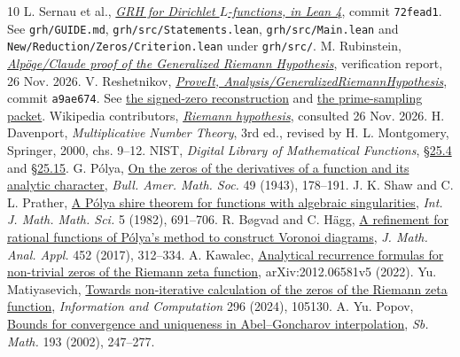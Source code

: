 \documentclass[11pt,letterpaper]{article}
\numberwithin{equation}{section}
\begin{document}
\small
\begin{thebibliography}{10}\setlength{\itemsep}{1pt}\setlength{\parsep}{0pt}\setlength{\parskip}{0pt}
 L. Sernau et al., \href{https://github.com/lsernau/grh-lean/tree/72fead102f663d5c7a407964a13dc0cf9d977207}{\emph{GRH for Dirichlet $L$-functions, in Lean 4}},
commit \texttt{72fead1}. See \texttt{grh/GUIDE.md}, \texttt{grh/src/Statements.lean}, \texttt{grh/src/Main.lean} and \texttt{New/Reduction/Zeros/Criterion.lean} under \texttt{grh/src/}.
 M. Rubinstein, \href{https://www.math.uwaterloo.ca/~mrubinst/alpoge_claude_grh/}{\emph{Alp\"oge/Claude proof of the Generalized Riemann Hypothesis}}, verification report, 26 Nov. 2026.
 V. Reshetnikov, \href{https://github.com/VladimirReshetnikov/ProveIt/tree/a9ae674322c8c4cce1bb2262e577733d3959d741/Analysis/GeneralizedRiemannHypothesis}{\emph{ProveIt, Analysis/GeneralizedRiemannHypothesis}}, commit \texttt{a9ae674}. See \href{https://github.com/VladimirReshetnikov/ProveIt/blob/a9ae674322c8c4cce1bb2262e577733d3959d741/Analysis/GeneralizedRiemannHypothesis/Research/grh-torsion-and-zero-data/recovery.tex}{the signed-zero reconstruction} and \href{https://github.com/VladimirReshetnikov/ProveIt/blob/a9ae674322c8c4cce1bb2262e577733d3959d741/Analysis/GeneralizedRiemannHypothesis/Research/grh-torsion-and-prime-sampling/prime-sampling.tex}{the prime-sampling packet}.
 Wikipedia contributors, \href{https://en.wikipedia.org/wiki/Riemann_hypothesis}{\emph{Riemann hypothesis}}, consulted 26 Nov. 2026.
 H. Davenport, \emph{Multiplicative Number Theory}, 3rd ed., revised by H. L. Montgomery, Springer, 2000, chs. 9--12.
 NIST, \emph{Digital Library of Mathematical Functions}, \href{https://dlmf.nist.gov/25.4}{\S25.4} and \href{https://dlmf.nist.gov/25.15}{\S25.15}.
 G. P\'olya, \href{https://projecteuclid.org/journals/bulletin-of-the-american-mathematical-society/volume-49/issue-3.P1/On-the-zeros-of-the-derivatives-of-a-function-and/bams/1183505036.full}{On the zeros of the derivatives of a function and its analytic character}, \emph{Bull. Amer. Math. Soc.} 49 (1943), 178--191.
 J. K. Shaw and C. L. Prather, \href{https://doi.org/10.1155/S0161171282000635}{A P\'olya shire theorem for functions with algebraic singularities}, \emph{Int. J. Math. Math. Sci.} 5 (1982), 691--706.
 R. B\o gvad and C. H\"agg, \href{https://arxiv.org/abs/1610.00921}{A refinement for rational functions of P\'olya's method to construct Voronoi diagrams}, \emph{J. Math. Anal. Appl.} 452 (2017), 312--334.
 A. Kawalec, \href{https://arxiv.org/abs/2012.06581}{Analytical recurrence formulas for non-trivial zeros of the Riemann zeta function}, arXiv:2012.06581v5 (2022).
 Yu. Matiyasevich, \href{https://doi.org/10.1016/j.ic.2023.105130}{Towards non-iterative calculation of the zeros of the Riemann zeta function}, \emph{Information and Computation} 296 (2024), 105130.
 A. Yu. Popov, \href{https://geodesic.mathdoc.fr/item/SM_2002_193_2_a4/}{Bounds for convergence and uniqueness in Abel--Goncharov interpolation}, \emph{Sb. Math.} 193 (2002), 247--277.
\end{thebibliography}
\end{document}

